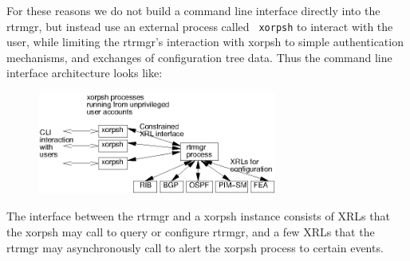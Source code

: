 \documentclass[11pt]{article}
\begin{document}
For these reasons we do not build a command line interface directly
into the rtrmgr, but instead use an external process called {\tt
xorpsh} to interact with the user, while limiting the rtrmgr's
interaction with xorpsh to simple authentication mechanisms, and
exchanges of configuration tree data.  Thus the command line interface
architecture looks like:
\begin{figure}[htb]
\centerline{\includegraphics[width=0.7\textwidth]{figs/xorpsh}}
\vspace{.05in}
\end{figure}

The interface between the rtrmgr and a xorpsh instance consists of
XRLs that the xorpsh may call to query or configure rtrmgr, and a few
XRLs that the rtrmgr may asynchronously call to alert the xorpsh
process to certain events.  
\end{document}
